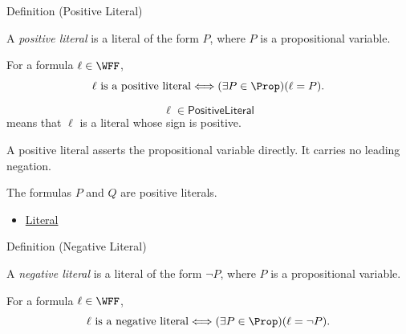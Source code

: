 \begin{definitionbox}{Definition (Positive Literal)}
\begin{definition}
\label{def:positive-literal-propositional-logic}
A \emph{positive literal} is a literal of the form \(P\), where \(P\) is a
propositional variable.
\end{definition}
\end{definitionbox}

\begin{remark*}
For a formula \(\ell\in\WFF\),
\[
\ell\text{ is a positive literal}
\Longleftrightarrow
(\exists P\in\Prop)(\ell=P).
\]
\end{remark*}

\begin{remark*}
\[
\ell\in\mathsf{PositiveLiteral}
\]
means that \(\ell\) is a literal whose sign is positive.
\end{remark*}

\begin{remark*}[Interpretation]
A positive literal asserts the propositional variable directly. It carries no
leading negation.
\end{remark*}

\begin{remark*}[Examples]
The formulas \(P\) and \(Q\) are positive literals.
\end{remark*}

\begin{dependencies}
\begin{itemize}
  \item \hyperref[def:literal-propositional-logic]{Literal}
\end{itemize}
\end{dependencies}

\begin{definitionbox}{Definition (Negative Literal)}
\begin{definition}
\label{def:negative-literal-propositional-logic}
A \emph{negative literal} is a literal of the form \(\neg P\), where \(P\) is a
propositional variable.
\end{definition}
\end{definitionbox}

\begin{remark*}
For a formula \(\ell\in\WFF\),
\[
\ell\text{ is a negative literal}
\Longleftrightarrow
(\exists P\in\Prop)(\ell=\neg P).
\]
\end{remark*}

